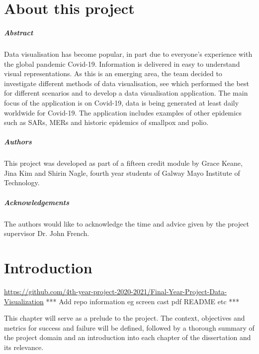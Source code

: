 
\chapter*{About this project}
\paragraph{Abstract}
Data visualisation has become popular, in part due to everyone's experience with the global pandemic Covid-19. Information is delivered in easy to understand visual representations. As this is an emerging area, the team decided to investigate different methods of data visualisation, see which performed the best for different scenarios and to develop a data visualisation application. The main focus of the application is on Covid-19, data is being generated at least daily worldwide for Covid-19. The application includes examples of other epidemics such as SARs, MERs and historic epidemics of smallpox and polio.

\paragraph{Authors}
This project was developed as part of a fifteen credit module by Grace Keane, Jina Kim and Shirin Nagle, fourth year students of Galway Mayo Institute of Technology.

\paragraph{Acknowledgements} The authors would like to acknowledge the time and advice given by the project supervisor Dr. John French.

\chapter{Introduction}
\url{https://github.com/4th-year-project-2020-2021/Final-Year-Project-Data-Visualization}
*** Add repo information eg screen cast pdf README etc ***

This chapter will serve as a prelude to the project. The context, objectives and metrics for success and failure will be defined, followed by a thorough summary of the project domain and an introduction into each chapter of the dissertation and its relevance.

